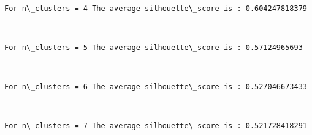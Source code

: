 \documentclass[11pt]{article}
\begin{document}
    \begin{center}
    \end{center}
    { \hspace*{\fill} \\}
    
    \begin{Verbatim}[commandchars=\\\{\}]
For n\_clusters = 4 The average silhouette\_score is : 0.604247818379

    \end{Verbatim}

    \begin{center}
    \end{center}
    { \hspace*{\fill} \\}
    
    \begin{Verbatim}[commandchars=\\\{\}]
For n\_clusters = 5 The average silhouette\_score is : 0.57124965693

    \end{Verbatim}

    \begin{center}
    \end{center}
    { \hspace*{\fill} \\}
    
    \begin{Verbatim}[commandchars=\\\{\}]
For n\_clusters = 6 The average silhouette\_score is : 0.527046673433

    \end{Verbatim}

    \begin{center}
    \end{center}
    { \hspace*{\fill} \\}
    
    \begin{Verbatim}[commandchars=\\\{\}]
For n\_clusters = 7 The average silhouette\_score is : 0.521728418291

    \end{Verbatim}
\end{document}
